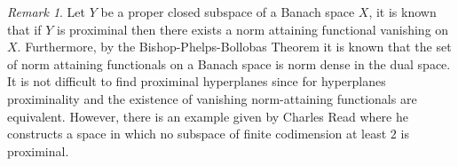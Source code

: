 \documentclass[12pt, reqno]{amsart}
\theoremstyle{definition}
\theoremstyle{remark}
\newtheorem{remark}[theorem]{Remark}
\numberwithin{equation}{section}
\begin{document}
\begin{remark}%
Let $Y$ be a proper closed subspace of a Banach space $X$, it is known that if $Y$ is proximinal then there exists a norm attaining functional vanishing on $X$. Furthermore,  by the  Bishop-Phelps-Bollobas Theorem \cite{BP} it is known that the set of norm attaining functionals on a Banach space is norm dense in the dual space. It is not difficult to find proximinal hyperplanes since for hyperplanes proximinality and the existence of vanishing norm-attaining functionals  are equivalent.  However, there is  an example given by Charles Read \cite{CR} where he constructs a space in which no subspace of  finite codimension at least $2$ is proximinal.
\end{remark}

\iffalse
\end{document}
